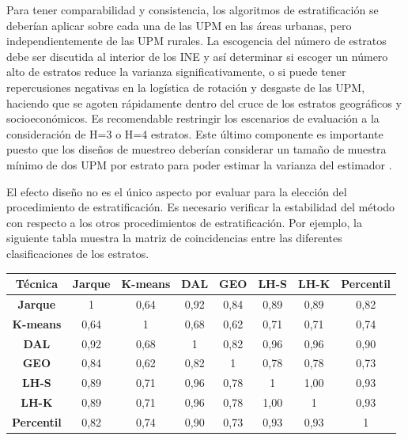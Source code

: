 \documentclass[
  10pt,
  spanish,
]{book}
\begin{document}
\normalsize

Para tener comparabilidad y consistencia, los algoritmos de estratificación se deberían aplicar sobre cada una de las UPM en las áreas urbanas, pero independientemente de las UPM rurales. La escogencia del número de estratos debe ser discutida al interior de los INE y así determinar si escoger un número alto de estratos reduce la varianza significativamente, o si puede tener repercusiones negativas en la logística de rotación y desgaste de las UPM, haciendo que se agoten rápidamente dentro del cruce de los estratos geográficos y socioeconómicos. Es recomendable restringir los escenarios de evaluación a la consideración de H=3 o H=4 estratos. Este último componente es importante puesto que los diseños de muestreo deberían considerar un tamaño de muestra mínimo de dos UPM por estrato para poder estimar la varianza del estimador \citep{Gutierrez_2016}.

El efecto diseño no es el único aspecto por evaluar para la elección del procedimiento de estratificación. Es necesario verificar la estabilidad del método con respecto a los otros procedimientos de estratificación. Por ejemplo, la siguiente tabla muestra la matriz de coincidencias entre las diferentes clasificaciones de los estratos.

\begin{longtable}[]{@{}cccccccc@{}}
\toprule
Técnica & Jarque & K-means & DAL & GEO & LH-S & LH-K & Percentil \\
\midrule
\endhead
\textbf{Jarque} & 1 & 0,64 & 0,92 & 0,84 & 0,89 & 0,89 & 0,82 \\
\textbf{K-means} & 0,64 & 1 & 0,68 & 0,62 & 0,71 & 0,71 & 0,74 \\
\textbf{DAL} & 0,92 & 0,68 & 1 & 0,82 & 0,96 & 0,96 & 0,90 \\
\textbf{GEO} & 0,84 & 0,62 & 0,82 & 1 & 0,78 & 0,78 & 0,73 \\
\textbf{LH-S} & 0,89 & 0,71 & 0,96 & 0,78 & 1 & 1,00 & 0,93 \\
\textbf{LH-K} & 0,89 & 0,71 & 0,96 & 0,78 & 1,00 & 1 & 0,93 \\
\textbf{Percentil} & 0,82 & 0,74 & 0,90 & 0,73 & 0,93 & 0,93 & 1 \\
\bottomrule
\end{longtable}
\end{document}
